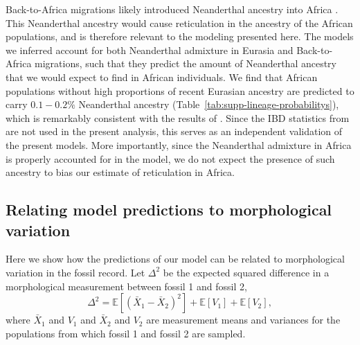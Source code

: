 \documentclass[]{article}
\newcommand{\E}{\mathbb{E}}
\begin{document}
Back-to-Africa migrations likely introduced Neanderthal ancestry into Africa
\citep{Chen2020-wh}. This Neanderthal ancestry would cause reticulation in the
ancestry of the African populations, and is therefore relevant to the modeling
presented here. The models we inferred account for both Neanderthal admixture
in Eurasia and Back-to-Africa migrations, such that they predict the amount of
Neanderthal ancestry that we would expect to find in African individuals. We
find that African populations without high proportions of recent Eurasian
ancestry are predicted to carry $0.1-0.2\%$ Neanderthal
ancestry (Table~\ref{tab:supp-lineage-probabilitys}),
which is remarkably consistent with the results of
\citet{Chen2020-wh}. Since the IBD statistics from \citet{Chen2020-wh} are not
used in the present analysis, this serves as an independent validation of the
present models. More importantly, since the Neanderthal admixture in Africa is
properly accounted for in the model, we do not expect the presence of such
ancestry to bias our estimate of reticulation in Africa.

\subsection{Relating model predictions to morphological variation}
\label{sec:morpho_diff}

Here we show how the predictions of our model can be related to morphological
variation in the fossil record.
Let $\Delta^2$ be the expected squared difference in a morphological measurement
between fossil 1 and fossil 2,
\begin{equation}
    \Delta^2=\E\left[\left(\bar{X}_1-\bar{X}_2\right)^2\right]+\E\left[V_1\right]+\E\left[V_2\right],
\end{equation}
where $\bar{X}_1$ and $V_1$ and $\bar{X}_2$ and $V_2$ are measurement means and
variances for the populations from which fossil 1 and fossil 2 are sampled.
\end{document}
